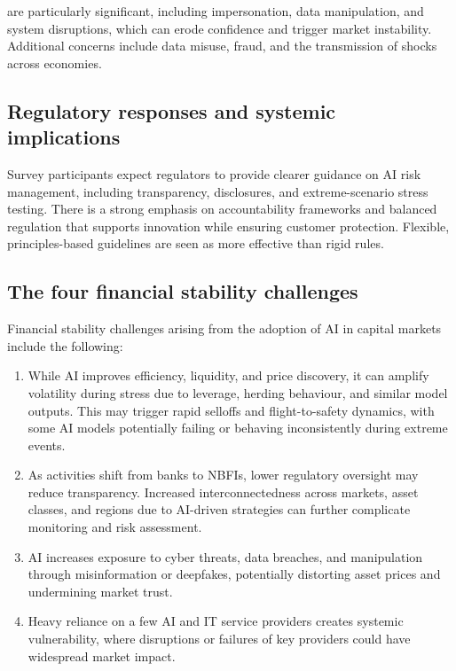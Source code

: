  are particularly significant, including impersonation, data manipulation,
and system disruptions, which can erode confidence and trigger market instability.
Additional concerns include data misuse, fraud, and the transmission of shocks across
economies.

\subsection*{Regulatory responses and systemic implications}

Survey participants expect regulators to provide clearer guidance on AI risk management,
including transparency, disclosures, and extreme-scenario stress testing. There is a strong
emphasis on accountability frameworks and balanced regulation that supports innovation while
ensuring customer protection. Flexible, principles-based guidelines are seen as more
effective than rigid rules.

\subsection*{The four financial stability challenges}

Financial stability challenges arising from the adoption of AI in capital markets include the
following:

\begin{enumerate}
\item {} While AI improves efficiency,
liquidity, and price discovery, it can amplify volatility during stress due to leverage,
herding behaviour, and similar model outputs. This may trigger rapid selloffs and
flight-to-safety dynamics, with some AI models potentially failing or behaving
inconsistently during extreme events.
\item {} As activities shift from banks to NBFIs,
lower regulatory oversight may reduce transparency. Increased interconnectedness across
markets, asset classes, and regions due to AI-driven strategies can further complicate
monitoring and risk assessment.
\item {} AI increases exposure to cyber threats,
data breaches, and manipulation through misinformation or deepfakes, potentially distorting
asset prices and undermining market trust.
\item {} Heavy reliance on a few AI and IT
service providers creates systemic vulnerability, where disruptions or failures of key
providers could have widespread market impact.
\end{enumerate}

